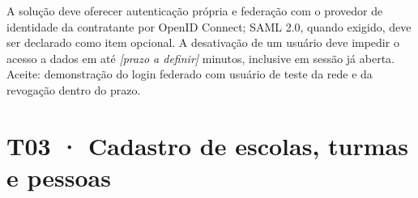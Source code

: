\begin{paraotr}
A solução deve oferecer autenticação própria e federação com o provedor de
identidade da contratante por OpenID Connect; SAML 2.0, quando exigido,
deve ser declarado como item opcional. A desativação de um usuário deve
impedir o acesso a dados em até \textit{[prazo a definir]} minutos, inclusive
em sessão já aberta. Aceite: demonstração do login federado com usuário de
teste da rede e da revogação dentro do prazo.
\end{paraotr}

\section{T03 · Cadastro de escolas, turmas e pessoas}
\label{sec:t03}

